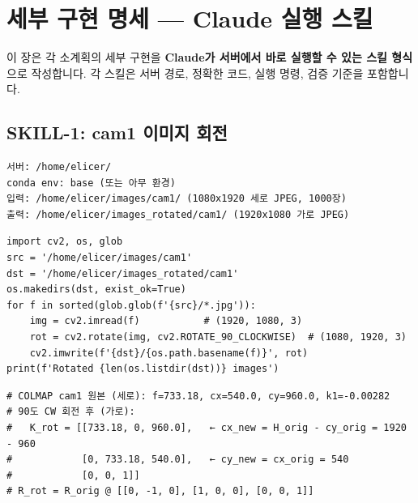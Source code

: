 \documentclass[11pt, a4paper]{report}
\begin{document}
\chapter{세부 구현 명세 --- Claude 실행 스킬}

이 장은 각 소계획의 세부 구현을 \textbf{Claude가 서버에서 바로 실행할 수 있는 스킬 형식}으로 작성합니다. 각 스킬은 서버 경로, 정확한 코드, 실행 명령, 검증 기준을 포함합니다.


\section{SKILL-1: cam1 이미지 회전}

\begin{codebox}[title={서버 경로 및 환경}]
\begin{verbatim}
서버: /home/elicer/
conda env: base (또는 아무 환경)
입력: /home/elicer/images/cam1/ (1080x1920 세로 JPEG, 1000장)
출력: /home/elicer/images_rotated/cam1/ (1920x1080 가로 JPEG)
\end{verbatim}
\end{codebox}

\begin{codebox}[title={Python 코드}]
\begin{verbatim}
import cv2, os, glob
src = '/home/elicer/images/cam1'
dst = '/home/elicer/images_rotated/cam1'
os.makedirs(dst, exist_ok=True)
for f in sorted(glob.glob(f'{src}/*.jpg')):
    img = cv2.imread(f)           # (1920, 1080, 3)
    rot = cv2.rotate(img, cv2.ROTATE_90_CLOCKWISE)  # (1080, 1920, 3)
    cv2.imwrite(f'{dst}/{os.path.basename(f)}', rot)
print(f'Rotated {len(os.listdir(dst))} images')
\end{verbatim}
\end{codebox}

\begin{codebox}[title={cam1 K행렬 변환 (COLMAP SIMPLE\_RADIAL)}]
\begin{verbatim}
# COLMAP cam1 원본 (세로): f=733.18, cx=540.0, cy=960.0, k1=-0.00282
# 90도 CW 회전 후 (가로):
#   K_rot = [[733.18, 0, 960.0],   ← cx_new = H_orig - cy_orig = 1920 - 960
#            [0, 733.18, 540.0],   ← cy_new = cx_orig = 540
#            [0, 0, 1]]
# R_rot = R_orig @ [[0, -1, 0], [1, 0, 0], [0, 0, 1]]
\end{verbatim}
\end{codebox}
\end{document}
